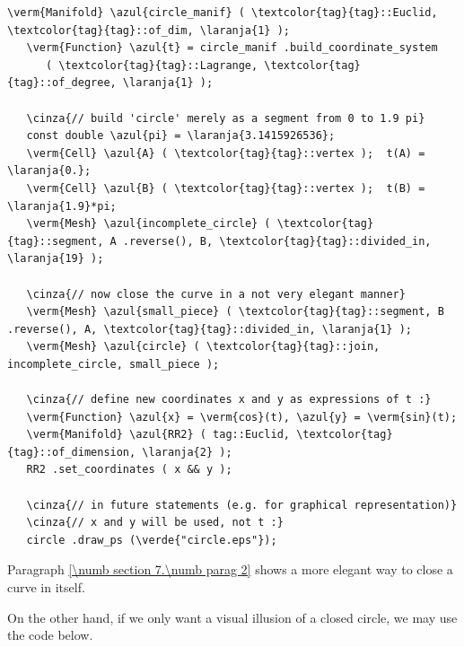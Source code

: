 \begin{Verbatim}[commandchars=\\\{\},formatcom=\small\tt,frame=single,
   label=parag-\ref{\numb section 2.\numb parag 18}.cpp,rulecolor=\color{coment},
   baselinestretch=0.94,framesep=2mm]
   \verm{Manifold} \azul{circle_manif} ( \textcolor{tag}{tag}::Euclid, \textcolor{tag}{tag}::of_dim, \laranja{1} );
   \verm{Function} \azul{t} = circle_manif .build_coordinate_system
      ( \textcolor{tag}{tag}::Lagrange, \textcolor{tag}{tag}::of_degree, \laranja{1} );

   \cinza{// build 'circle' merely as a segment from 0 to 1.9 pi}
   const double \azul{pi} = \laranja{3.1415926536};
   \verm{Cell} \azul{A} ( \textcolor{tag}{tag}::vertex );  t(A) =  \laranja{0.};
   \verm{Cell} \azul{B} ( \textcolor{tag}{tag}::vertex );  t(B) =  \laranja{1.9}*pi;
   \verm{Mesh} \azul{incomplete_circle} ( \textcolor{tag}{tag}::segment, A .reverse(), B, \textcolor{tag}{tag}::divided_in, \laranja{19} );

   \cinza{// now close the curve in a not very elegant manner}
   \verm{Mesh} \azul{small_piece} ( \textcolor{tag}{tag}::segment, B .reverse(), A, \textcolor{tag}{tag}::divided_in, \laranja{1} );
   \verm{Mesh} \azul{circle} ( \textcolor{tag}{tag}::join, incomplete_circle, small_piece );

   \cinza{// define new coordinates x and y as expressions of t :}
   \verm{Function} \azul{x} = \verm{cos}(t), \azul{y} = \verm{sin}(t);
   \verm{Manifold} \azul{RR2} ( tag::Euclid, \textcolor{tag}{tag}::of_dimension, \laranja{2} );
   RR2 .set_coordinates ( x && y );

   \cinza{// in future statements (e.g. for graphical representation)}
   \cinza{// x and y will be used, not t :}
   circle .draw_ps (\verde{"circle.eps"});
\end{Verbatim}

Paragraph \ref{\numb section 7.\numb parag 2} shows a more elegant way to close a curve in itself.

On the other hand, if we only want a visual illusion of a closed circle, we may use the code below.

